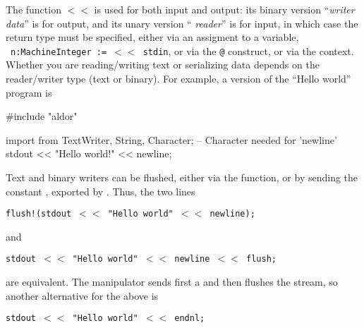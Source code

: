 The function {\tt $<<$} is used for both input and output:
its binary version ``{\em writer}  {\em data}''
is for output,
and its unary version `` {\em reader}'' is for input,
in which
case the return type must be specified, either via an assigment to a variable,
\eg~{\tt n:MachineInteger := $<<$ stdin}, or via the {\tt @} construct, or via
the context. Whether you are reading/writing text or serializing data depends
on the reader/writer type (text or binary).
For example, a \libaldor{} version of the ``Hello world'' program is
\begin{ttyout}
#include "aldor"

import from TextWriter, String, Character;  -- Character needed for 'newline'
stdout << "Hello world!" << newline;
\end{ttyout}
\noindent
Text and binary writers can be flushed, either via the
function, or by sending the constant ,
exported by . Thus, the two lines\\
\centerline{\tt flush!(stdout $<<$ "Hello world" $<<$ newline);}
and\\
\centerline{\tt stdout $<<$ "Hello world" $<<$ newline $<<$ flush;}
are equivalent. The manipulator 
sends first a 
and then flushes the stream, so another alternative for the above is\\
\centerline{\tt stdout $<<$ "Hello world" $<<$ endnl;}

